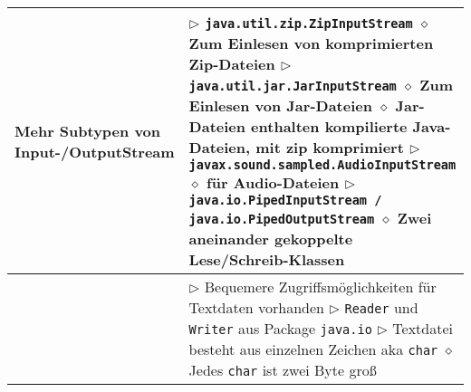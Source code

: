 \begin{longtable}{ | p{4cm} p{13.5cm} | }
	\makecell[l]{Mehr Subtypen von \\Input-/OutputStream} & \makecell[l]{
	$\rhd$ \texttt{java.util.zip.ZipInputStream} \\
	\hspace{0.4cm} $\diamond$ Zum Einlesen von komprimierten Zip-Dateien \\
	$\rhd$ \texttt{java.util.jar.JarInputStream} \\
	\hspace{0.4cm} $\diamond$ Zum Einlesen von Jar-Dateien \\
	\hspace{0.4cm} $\diamond$ Jar-Dateien enthalten kompilierte Java-Dateien, mit zip komprimiert \\
	$\rhd$ \texttt{javax.sound.sampled.AudioInputStream} \\
	\hspace{0.4cm} $\diamond$ für Audio-Dateien \\
	$\rhd$ \texttt{java.io.PipedInputStream / java.io.PipedOutputStream} \\
	\hspace{0.4cm} $\diamond$ Zwei aneinander gekoppelte Lese/Schreib-Klassen
	} \\ \hline

	\makecell[l]{Textdaten direkt} & \makecell[l]{$\rhd$ Bequemere Zugriffsmöglichkeiten für Textdaten vorhanden \\
	$\rhd$ \texttt{Reader} und \texttt{Writer} aus Package \texttt{java.io} \\
	$\rhd$ Textdatei besteht aus einzelnen Zeichen aka \texttt{char} \\
	\hspace{0.4cm} $\diamond$ Jedes \texttt{char} ist zwei Byte gro\ss} \\ \hline


\end{longtable}
